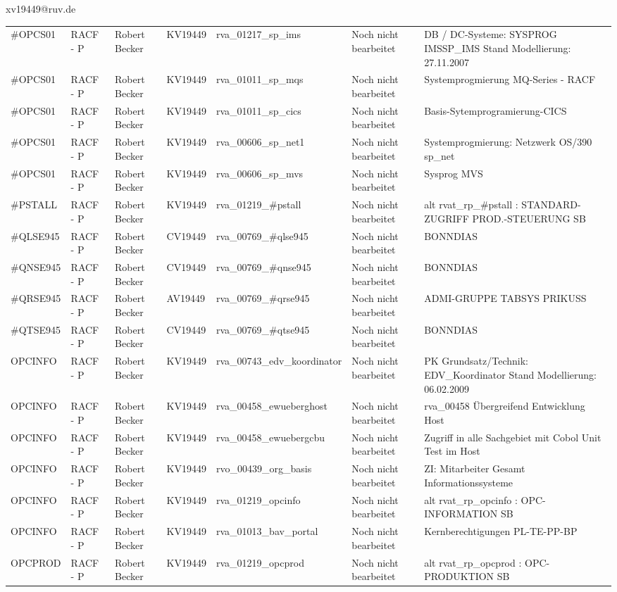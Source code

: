 \documentclass[a4paper,landscape,12pt]{letter}
\begin{document}
\begin{letter}{xv19449@ruv.de\hfill \break}
\begin{tiny}
\begin{longtable}{|p{35mm}|p{15mm}|p{25mm}|p{10mm}|p{40mm}|p{50mm}|p{50mm}|}
\#OPCS01 & RACF - P & Robert Becker & KV19449 & rva\_01217\_sp\_ims & Noch nicht bearbeitet & DB / DC-Systeme:  SYSPROG IMSSP\_IMS Stand Modellierung: 27.11.2007 \\
\#OPCS01 & RACF - P & Robert Becker & KV19449 & rva\_01011\_sp\_mqs & Noch nicht bearbeitet & Systemprogmierung MQ-Series - RACF \\
\#OPCS01 & RACF - P & Robert Becker & KV19449 & rva\_01011\_sp\_cics & Noch nicht bearbeitet & Basis-Sytemprogramierung-CICS \\
\#OPCS01 & RACF - P & Robert Becker & KV19449 & rva\_00606\_sp\_net1 & Noch nicht bearbeitet & Systemprogmierung: Netzwerk OS/390 sp\_net \\
\#OPCS01 & RACF - P & Robert Becker & KV19449 & rva\_00606\_sp\_mvs & Noch nicht bearbeitet & Sysprog MVS \\
\#PSTALL & RACF - P & Robert Becker & KV19449 & rva\_01219\_\#pstall & Noch nicht bearbeitet & alt rvat\_rp\_\#pstall          : STANDARD-ZUGRIFF PROD.-STEUERUNG SB \\
\#QLSE945 & RACF - P & Robert Becker & CV19449 & rva\_00769\_\#qlse945 & Noch nicht bearbeitet & BONNDIAS \\
\#QNSE945 & RACF - P & Robert Becker & CV19449 & rva\_00769\_\#qnse945 & Noch nicht bearbeitet & BONNDIAS \\
\#QRSE945 & RACF - P & Robert Becker & AV19449 & rva\_00769\_\#qrse945 & Noch nicht bearbeitet & ADMI-GRUPPE TABSYS PRIKUSS \\
\#QTSE945 & RACF - P & Robert Becker & CV19449 & rva\_00769\_\#qtse945 & Noch nicht bearbeitet & BONNDIAS \\
OPCINFO & RACF - P & Robert Becker & KV19449 & rva\_00743\_edv\_koordinator & Noch nicht bearbeitet & PK Grundsatz/Technik: EDV\_Koordinator Stand Modellierung: 06.02.2009 \\
OPCINFO & RACF - P & Robert Becker & KV19449 & rva\_00458\_ewueberghost & Noch nicht bearbeitet & rva\_00458 Übergreifend Entwicklung Host \\
OPCINFO & RACF - P & Robert Becker & KV19449 & rva\_00458\_ewuebergcbu & Noch nicht bearbeitet & Zugriff in alle Sachgebiet mit Cobol Unit Test im Host \\
OPCINFO & RACF - P & Robert Becker & KV19449 & rvo\_00439\_org\_basis & Noch nicht bearbeitet & ZI: Mitarbeiter Gesamt Informationssysteme \\
OPCINFO & RACF - P & Robert Becker & KV19449 & rva\_01219\_opcinfo & Noch nicht bearbeitet & alt rvat\_rp\_opcinfo          : OPC- INFORMATION                         SB \\
OPCINFO & RACF - P & Robert Becker & KV19449 & rva\_01013\_bav\_portal & Noch nicht bearbeitet & Kernberechtigungen PL-TE-PP-BP \\
OPCPROD & RACF - P & Robert Becker & KV19449 & rva\_01219\_opcprod & Noch nicht bearbeitet & alt rvat\_rp\_opcprod          : OPC-PRODUKTION                           SB \\


\end{longtable}
\end{tiny}
\end{letter}
\end{document}
